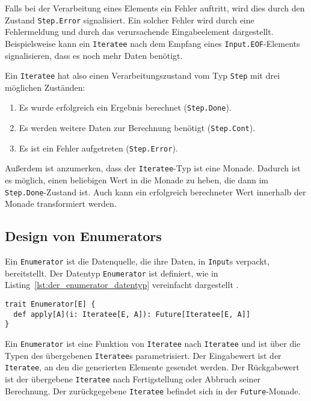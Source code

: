 Falls bei der Verarbeitung eines Elements ein Fehler auftritt, wird dies durch den Zustand \lstinline|Step.Error| signalisiert.
Ein solcher Fehler wird durch eine Fehlermeldung und durch das verursachende Eingabeelement dargestellt.
Beispielsweise kann ein \lstinline|Iteratee| nach dem Empfang eines \lstinline|Input.EOF|-Elements signalisieren, dass es noch mehr Daten benötigt.

Ein \lstinline|Iteratee| hat also einen Verarbeitungszustand vom Typ \lstinline|Step| mit drei möglichen Zuständen:
\begin{enumerate}
  \item Es wurde erfolgreich ein Ergebnis berechnet (\lstinline|Step.Done|).
  \item Es werden weitere Daten zur Berechnung benötigt (\lstinline|Step.Cont|).
  \item Es ist ein Fehler aufgetreten (\lstinline|Step.Error|).
\end{enumerate}

Außerdem ist anzumerken, dass der \lstinline|Iteratee|-Typ ist eine Monade.
Dadurch ist es möglich, einen beliebigen Wert in die Monade zu heben, die dann im \lstinline|Step.Done|-Zustand ist.
Auch kann ein erfolgreich berechneter Wert innerhalb der Monade transformiert werden.



\subsection{Design von Enumerators} %
\label{sub:design_enumerators}

Ein \lstinline|Enumerator| ist die Datenquelle, die ihre Daten, in \lstinline|Input|s verpackt, bereitstellt.
Der Datentyp \lstinline|Enumerator| ist definiert, wie in Listing~\ref{lst:der_enumerator_datentyp} vereinfacht dargestellt \cite[vgl.][]{play_enumerator_source_code}.
\begin{lstlisting}[caption=Der Enumerator-Datentyp, label=lst:der_enumerator_datentyp]
trait Enumerator[E] {
  def apply[A](i: Iteratee[E, A]): Future[Iteratee[E, A]]
}
\end{lstlisting}

Ein \lstinline|Enumerator| ist eine Funktion von \lstinline|Iteratee| nach \lstinline|Iteratee| und ist über die Typen des übergebenen \lstinline|Iteratee|s parametrisiert.
Der Eingabewert ist der \lstinline|Iteratee|, an den die generierten Elemente gesendet werden.
Der Rückgabewert ist der übergebene \lstinline|Iteratee| nach Fertigstellung oder Abbruch seiner Berechnung.
Der zurückgegebene \lstinline|Iteratee| befindet sich in der \lstinline|Future|-Monade.

